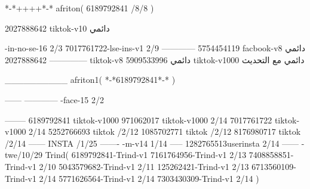 *-*++++*-*
afriton(
6189792841 /8/8
)

2027888642 tiktok-v10
دائمي

-in-no-se-16 2/3
7017761722-lse-ins-v1 2/9
------------
5754454119 facbook-v8
دائمي
--------------
2027888642 tiktok-v8
دائمي
5909533996 tiktok-v1000
دائمي مع التحديث

__________
afriton1(
*-*6189792841*-*
)

------
------------
-face-15 2/2

--------
6189792841 tiktok-v1000
971062017 tiktok-v1000 2/14
7017761722 tiktok-v1000 2/14
5252766693 tiktok /2/12
1085702771 tiktok /2/12
8176980717 tiktok /2/14
------
 INSTA /1/25
-------
-m-v14 1/14
-----
1282765513userinsta 2/14
------
-twe/10/29
Trind(
6189792841-Trind-v1 
7161764956-Trind-v1 2/13
7408858851-Trind-v1 2/10
5043579682-Trind-v1 2/11
125262421-Trind-v1 2/13
6713560109-Trind-v1 2/14
5771626564-Trind-v1 2/14
7303430309-Trind-v1 2/14
)
